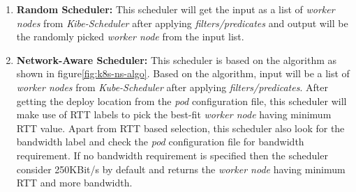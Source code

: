 \begin{enumerate}
  \item \textbf{Random Scheduler:} This scheduler will get the input as a list of \emph{worker nodes} from \emph{Kibe-Scheduler} after applying \emph{filters/predicates} and output will be the randomly picked \emph{worker node} from the input list.
  \item \textbf{Network-Aware Scheduler:} This scheduler is based on the algorithm as shown in figure\ref{fig:k8s-ns-algo}. Based on the algorithm, input will be a list of \emph{worker nodes} from \emph{Kube-Scheduler} after applying \emph{filters/predicates}. After getting the deploy location from the \emph{pod} configuration file, this scheduler will make use of RTT labels to pick the best-fit \emph{worker node} having minimum RTT value\cite{Santos2019}. Apart from RTT based selection, this scheduler also look for the bandwidth label and check the \emph{pod} configuration file for bandwidth requirement. If no bandwidth requirement is specified then the scheduler consider 250KBit/s by default and returns the \emph{worker node} having minimum RTT and more bandwidth\cite{Santos2019}.
\end{enumerate}
